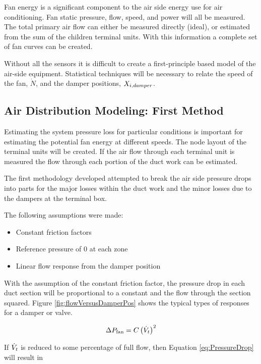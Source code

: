 Fan energy is a significant component to the air side energy use for air conditioning. Fan static pressure, flow, speed, and power will all be measured. The total primary air flow can either be measured directly (ideal), or estimated from the sum of the children terminal units. With this information a complete set of fan curves can be created. 

Without all the sensors it is difficult to create a first-principle based model of the air-side equipment. Statistical techniques will be necessary to relate the speed of the fan, \(\dot N\), and the damper positions, \(X_{i,damper}\). 

\subsection{Air Distribution Modeling: First Method}

Estimating the system pressure loss for particular conditions is important for estimating the potential fan energy at different speeds. The node layout of the terminal units will be created. If the air flow through each terminal unit is measured the flow through each portion of the duct work can be estimated. 

The first methodology developed attempted to break the air side pressure drops into parts for the major losses within the duct work and the minor losses due to the dampers at the terminal box. 

The following assumptions were made:

\begin{itemize}
    \item Constant friction factors
    \item Reference pressure of 0 at each zone
    \item Linear flow response from the damper position
\end{itemize}

With the assumption of the constant friction factor, the pressure drop in each duct section will be proportional to a constant and the flow through the section squared. Figure \ref{fig:flowVersusDamperPos} shows the typical types of responses for a damper or valve.

\begin{equation}\label{eq:PressureDrop}
    \Delta P_{\text{fan}} = C\left(\dot{V}_{t}\right)^2
\end{equation}

 If \(\dot{V}_{t}\) is reduced to some percentage of full flow, then Equation \ref{eq:PressureDrop} will result in

